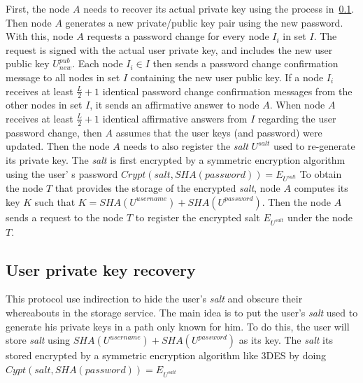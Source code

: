 First, the node $A$ needs to recover its actual private key using the process
in~\ref{sec:private_key_recovery}. Then node $A$ generates a new private/public
key pair using the new password.  With this, node $A$ requests a
password change for every node $I_i$ in set $I$. The request is signed with the
actual user private key, and includes the new user public key $U^{pub}_{new}$.
Each node $I_i \in I$ then sends a password change confirmation message to all nodes
in set $I$ containing the new user public key. If a node $I_i$ receives at
least $\frac{L}{2} + 1$ identical password change confirmation messages from
the other nodes in set $I$, it sends an affirmative answer to node $A$.
 When node $A$ receives at least $\frac{L}{2} + 1$ identical affirmative
answers from $I$ regarding the user password change, then $A$ assumes that the
user keys (and password) were updated.
Then the node $A$ needs to also register the \textit{salt} $U^{salt}$ used to
re-generate its private key. The \textit{salt} is first encrypted by a symmetric encryption algorithm
using the user' s password $Crypt(salt, SHA(password)) = E_{U^{salt}}$
To obtain the node $T$ that provides the storage of the encrypted \textit{salt},
node $A$ computes its key $K$ such that $K = SHA(U^{username})+SHA(U^{password})$.
Then the node $A$ sends a request to the node $T$ to register the
encrypted salt $E_{U^{salt}}$ under the node $T$.

\subsection{User private key recovery}
\label{sec:private_key_recovery}

This protocol use indirection to hide the user's
\textit{salt} and obscure their whereabouts in the storage service.
The main idea is to put the user's \textit{salt} used to generate his private keys in a
path only known for him. To do this, the user will store \textit{salt} using
$SHA(U^{username})+SHA(U^{password})$ as its key.  The \textit{salt} its stored encrypted
by a symmetric encryption algorithm like 3DES by doing $Cypt(salt,
SHA(password)) = E_{U^{salt}}$

